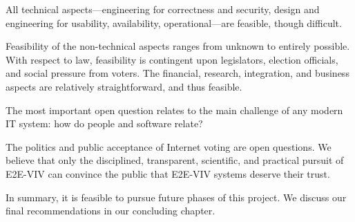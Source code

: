 All technical aspects---engineering for correctness and security,
design and engineering for usability, availability, operational---are
feasible, though difficult.

Feasibility of the non-technical aspects ranges from unknown to
entirely possible.  With respect to law, feasibility is contingent
upon legislators, election officials, and social pressure from voters.
The financial, research, integration, and business aspects are
relatively straightforward, and thus feasible.

The most important open question relates to the main challenge of any
modern IT system: how do people and software relate?

The politics and public acceptance of Internet voting are open
questions. We believe that only the disciplined, transparent,
scientific, and practical pursuit of E2E-VIV can convince the public
that E2E-VIV systems deserve their trust.

In summary, it is feasible to pursue future phases of this project. We
discuss our final recommendations in our concluding chapter.
